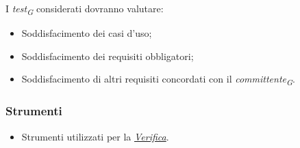 I \textit{test}\textsubscript{\textit{G}} considerati dovranno valutare: 
\begin{itemize}
    \item 
        Soddisfacimento dei casi d’uso;
    \item 
        Soddisfacimento dei requisiti obbligatori;
    \item 
        Soddisfacimento di altri requisiti concordati con il \textit{committente}\textsubscript{\textit{G}}.
\end{itemize}

\subsubsection{Strumenti}
\begin{itemize}
    \item 
        Strumenti utilizzati per la \hyperlink{subsubsec:strumentiVerifica}{\textit{Verifica}}.
\end{itemize}
